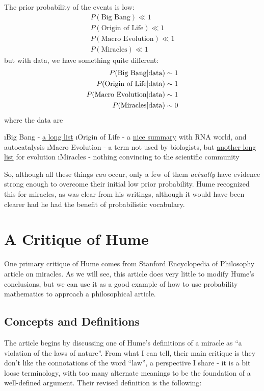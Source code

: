 The prior probability of the events is low:
\begin{eqnarray*}
P(\mbox{Big Bang})\ll 1 \\
P(\mbox{Origin of Life})\ll 1 \\
P(\mbox{Macro Evolution})\ll 1 \\
P(\mbox{Miracles})\ll 1
\end{eqnarray*}
but with data, we have something quite different:
\begin{eqnarray*}
P(\mbox{Big Bang}|{\rm data})\sim 1 \\
P(\mbox{Origin of Life}|{\rm data})\sim 1 \\
P(\mbox{Macro Evolution}|{\rm data})\sim 1 \\
P(\mbox{Miracles}|{\rm data})\sim  0
\end{eqnarray*}
where the data are

\bi
\i Big Bang - \href{http://www.talkorigins.org/faqs/astronomy/bigbang.html}{a long list}
\i Origin of Life - a \href{http://en.wikipedia.org/wiki/Abiogenesis}{nice summary} with RNA world, and autocatalysis
\i Macro Evolution - a term not used by biologists, but \href{http://www.talkorigins.org/faqs/comdesc/}{another long list} for evolution
\i Miracles - nothing convincing to the scientific community
\ei

So, although all these things \emph{can} occur, only a few of them \emph{actually} have evidence strong enough to overcome their initial low prior probability.  Hume recognized this for miracles, as was clear from his writings, although it would have been clearer had he had the benefit of probabilistic vocabulary. 

\section{A Critique of Hume}

One primary critique of Hume comes from Stanford Encyclopedia of Philosophy article on miracles\cite{sep-miracles}.  As we will see, this article does very little to modify Hume's conclusions, but we can use it as a good example of how to use probability mathematics to approach a philosophical article.

\subsection{Concepts and Definitions}\label{concepts-and-definitions}

The article begins by discussing one of Hume's definitions of a miracle
as ``a violation of the laws of nature''. From what I can tell, their
main critique is they don't like the connotations of the word ``law'', a
perspective I share - it is a bit loose terminology, with too many
alternate meanings to be the foundation of a well-defined argument.
Their revised definition is the following:

